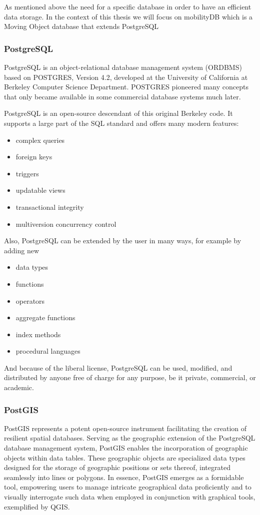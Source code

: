 \documentclass[twoside,12pt, a4paper]{report}
\begin{document}
As mentioned above the need for a specific database in order to have an efficient data storage.
In the context of this thesis we will focus on mobilityDB which is a Moving Object database that extends
PostgreSQL

\subsubsection{PostgreSQL}

\cite{postgresql} PostgreSQL is an object-relational database management system (ORDBMS) based on POSTGRES, Version 4.2,
developed at the University of California at Berkeley Computer Science Department. POSTGRES pioneered many
concepts that only became available in some commercial database systems much later.

PostgreSQL is an open-source descendant of this original Berkeley code. It supports a large part of the SQL standard
and offers many modern features:

\begin{itemize}
	
	\item complex queries
	\item foreign keys
	\item triggers
	\item updatable views
	\item transactional integrity
	\item multiversion concurrency control
\end{itemize}

Also, PostgreSQL can be extended by the user in many ways, for example by adding new

\begin{itemize}
	\item data types
	\item functions
	\item operators
	\item aggregate functions
	\item index methods
	\item procedural languages
\end{itemize}
And because of the liberal license, PostgreSQL can be used, modified, and distributed by anyone free of charge for any purpose, be it private, commercial, or academic.


\subsubsection{PostGIS}
\cite{marquez2015postgis} PostGIS represents a potent open-source instrument facilitating the creation of resilient spatial databases. Serving as the geographic extension of the PostgreSQL database management system, PostGIS enables the incorporation of geographic objects within data tables. These geographic objects are specialized data types designed for the storage of geographic positions or sets thereof, integrated seamlessly into lines or polygons. In essence, PostGIS emerges as a formidable tool, empowering users to manage intricate geographical data proficiently and to visually interrogate such data when employed in conjunction with graphical tools, exemplified by QGIS.
\end{document}
